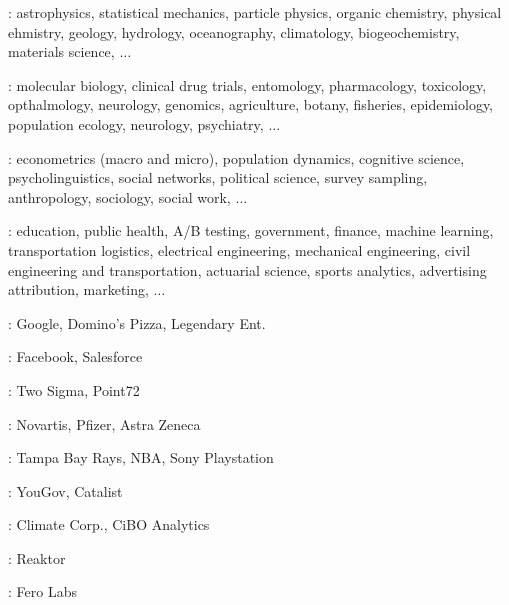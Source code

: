 \documentclass[10pt]{report}
\begin{document}
%
\begin{subitemize}
\item {}: {\footnotesize
astrophysics, statistical mechanics, particle physics, organic
chemistry, physical ehmistry, geology, hydrology,
oceanography, climatology, biogeochemistry, materials science, $\ldots$
}
\vspace*{-3pt}
\item {}: {\footnotesize
molecular biology, clinical drug trials, entomology, pharmacology,
toxicology, opthalmology, neurology, genomics, agriculture, botany, fisheries,
epidemiology, population ecology, neurology, psychiatry, $\ldots$
}
\vspace*{-3pt}
\item {}: {\footnotesize
 econometrics (macro and micro), population dynamics, cognitive
 science, psycholinguistics, social networks, political science,
 survey sampling, anthropology, sociology, social work, $\ldots$
}
\vspace*{-3pt}
\item {}: {\footnotesize education, public health, A/B testing,
government, finance, machine learning, transportation logistics,
electrical engineering, mechanical engineering, civil engineering and transportation,
actuarial science, sports analytics, advertising attribution, marketing, $\ldots$}
\end{subitemize}

\vspace*{3pt}
\begin{subitemize}
\item {}: Google, Domino's Pizza, Legendary Ent.
\item {}: Facebook, Salesforce
\item {}: Two Sigma, Point72
\item {}: Novartis, Pfizer, Astra Zeneca
\item {}: Tampa Bay Rays, NBA, Sony Playstation
\item {}: YouGov, Catalist
\item {}: Climate Corp., CiBO Analytics
\item {}: Reaktor
\item {}: Fero Labs
\end{subitemize}
\end{document}
